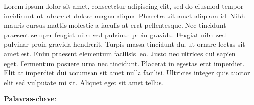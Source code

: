 
\begin{resumo}[RESUMO]
\begin{SingleSpacing}


Lorem ipsum dolor sit amet, consectetur adipiscing elit, sed do eiusmod tempor incididunt ut labore et dolore magna aliqua. Pharetra sit amet aliquam id. Nibh mauris cursus mattis molestie a iaculis at erat pellentesque. Nec tincidunt praesent semper feugiat nibh sed pulvinar proin gravida. Feugiat nibh sed pulvinar proin gravida hendrerit. Turpis massa tincidunt dui ut ornare lectus sit amet est. Enim praesent elementum facilisis leo. Justo nec ultrices dui sapien eget. Fermentum posuere urna nec tincidunt. Placerat in egestas erat imperdiet. Elit at imperdiet dui accumsan sit amet nulla facilisi. Ultricies integer quis auctor elit sed vulputate mi sit. Aliquet eget sit amet tellus.
\end{SingleSpacing}

\begin{SingleSpacing}
\textbf{Palavras-chave}: 
\end{SingleSpacing}
\end{resumo}


